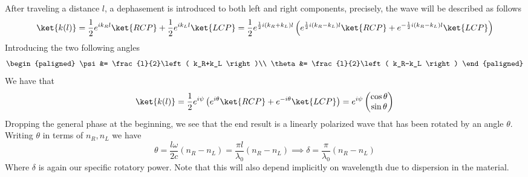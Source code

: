 \documentclass[../electromagnetism.tex]{subfiles}
\begin{document}
After traveling a distance $l$, a dephasement is introduced to both left and right components, precisely, the wave will be described as follows
\begin{equation}
	\ket{k(l)}=\frac{1}{2}e^{ik_Rl}\ket{RCP}+\frac{1}{2}e^{ik_Ll}\ket{LCP}=\frac{1}{2}e^{\frac{1}{2}i\left( k_R+k_L \right)l}\left( e^{\frac{1}{2}i\left( k_R-k_L \right)l}\ket{RCP}+e^{-\frac{1}{2}i\left( k_R-k_L \right)l}\ket{LCP} \right)
	\label{eq:afterl.bir}
\end{equation}
Introducing the two following angles
\begin{equation*}
	\begin{paligned}
		\psi&= \frac{l}{2}\left( k_R+k_L \right)\\
		\theta&= \frac{l}{2}\left( k_R-k_L \right)
	\end{paligned}
\end{equation*}
We have that 
\begin{equation}
	\ket{k(l)}=\frac{1}{2}e^{i\psi}\left( e^{i\theta}\ket{RCP}+e^{-i\theta}\ket{LCP} \right)=e^{i\psi}\begin{pmatrix}
		\cos\theta\\
		\sin\theta
	\end{pmatrix}
	\label{eq:rotation.bir}
\end{equation}
Dropping the general phase at the beginning, we see that the end result is a linearly polarized wave that has been rotated by an angle $\theta$.\\
Writing $\theta$ in terms of $n_R, n_L$ we have
\begin{equation}
	\theta=\frac{l\omega}{2c}\left( n_R-n_L \right)=\frac{\pi l}{\lambda_0}\left( n_R-n_L \right)\implies\delta=\frac{\pi}{\lambda_0}\left( n_R-n_L \right)
	\label{eq:rotationpower.bir}
\end{equation}
Where $\delta$ is again our specific rotatory power. Note that this will also depend implicitly on wavelength due to dispersion in the material.
\end{document}
